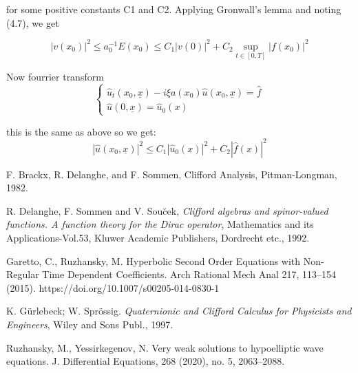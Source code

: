 \documentclass[12pt]{amsart}
\newcommand{\x}{x}
\newcommand{\norm}[1]{|#1|}
\theoremstyle{definition}
\newcommand{\un}{\underline}
\begin{document}
for some positive constants C1 and C2. Applying Gronwall’s lemma and noting (4.7),
we get

\[\norm{v (x_0)}^2 \leq a_0^{-1}E(x_0) \leq C_1\norm{v (0)}^2 +  C_2\sup_{t \in [0,T]}\norm{f(x_0)}^2\]

Now fourrier transform
\[
\begin{cases}
\hat{u}_t(x_0, \un{x}) -i\xi a(x_0)\hat{u}(x_0, \un{x}) = \hat{f}\\
\hat{u}(0, \un{x}) = \hat{u}_0(\x)
\end{cases}
\]

this is the same as above so we get:
\[\norm{\hat{u}(x_0, \un{x})}^2 \leq C_1\norm{\hat{u}_0(\x)}^2 + C_2\norm{\hat{f}(\x)}^2\]

\hrulefill


\begin{thebibliography}{2025}

 F. Brackx, R. Delanghe, and F. Sommen, Clifford Analysis, Pitman-Longman, 1982.

R. Delanghe, F. Sommen and V. Sou\u{c}ek, \textit{Clifford algebras and spinor-valued functions. A function theory for the Dirac operator}, Mathematics and its Applications-Vol.53, Kluwer Academic Publishers,
Dordrecht etc., 1992.


Garetto, C., Ruzhansky, M. Hyperbolic Second Order Equations with Non-Regular Time Dependent Coefficients. Arch Rational Mech Anal 217, 113–154 (2015). https://doi.org/10.1007/s00205-014-0830-1

 K. G\"urlebeck; W. Spr\"ossig. \textit{Quaternionic and Clifford Calculus for Physicists and Engineers}, Wiley and Sons Publ., 1997.	


Ruzhansky, M.,  Yessirkegenov, N.  Very weak solutions to hypoelliptic wave equations. J. Differential Equations, 268 (2020), no. 5, 2063–2088.
\end{thebibliography}
\end{document}
